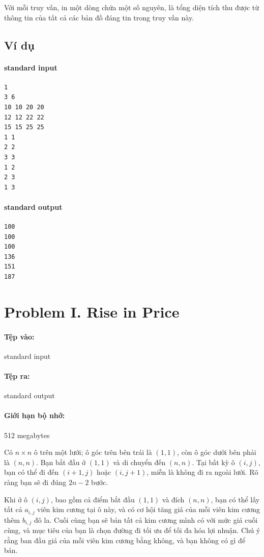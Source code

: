 \documentclass[11pt]{article}
\begin{document}
Với mỗi truy vấn, in một dòng chứa một số nguyên, là tổng diện tích thu được
từ thông tin của tất cả các bản đồ đáng tin trong truy vấn này.

\subsection*{Ví dụ}

\paragraph{standard input}
\begin{verbatim}
1
3 6
10 10 20 20
12 12 22 22
15 15 25 25
1 1
2 2
3 3
1 2
2 3
1 3
\end{verbatim}

\paragraph{standard output}
\begin{verbatim}
100
100
100
136
151
187
\end{verbatim}

\section{Problem I. Rise in Price}

\paragraph{Tệp vào:} standard input
\paragraph{Tệp ra:} standard output
\paragraph{Giới hạn bộ nhớ:} 512 megabytes

Có \(n\times n\) ô trên một lưới; ô góc trên bên trái là \((1,1)\), còn ô
góc dưới bên phải là \((n,n)\). Bạn bắt đầu ở \((1,1)\) và di chuyển đến
\((n,n)\). Tại bất kỳ ô \((i,j)\), bạn có thể đi đến \((i+1,j)\) hoặc
\((i,j+1)\), miễn là không đi ra ngoài lưới. Rõ ràng bạn sẽ đi đúng
\(2n-2\) bước.

Khi ở ô \((i,j)\), bao gồm cả điểm bắt đầu \((1,1)\) và đích \((n,n)\), bạn
có thể lấy tất cả \(a_{i,j}\) viên kim cương tại ô này, và có cơ hội tăng
giá của mỗi viên kim cương thêm \(b_{i,j}\) đô la. Cuối cùng bạn sẽ bán tất
cả kim cương mình có với mức giá cuối cùng, và mục tiêu của bạn là chọn đường
đi tối ưu để tối đa hóa lợi nhuận. Chú ý rằng ban đầu giá của mỗi viên kim
cương bằng không, và bạn không có gì để bán.
\end{document}
